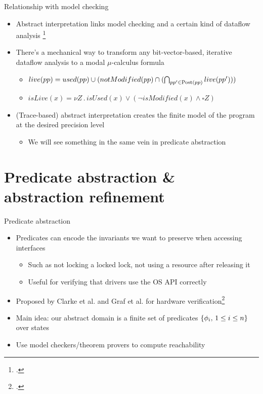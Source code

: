 \documentclass[aspectratio=169]{beamer}
\begin{document}
\begin{frame}{Relationship with model checking}
  \begin{itemize}[<+->]
  \item Abstract interpretation links model
    checking and a certain kind of dataflow analysis
    \footcite{schmidt1998program,schmidt1998data}
  \item There's a mechanical way to transform any bit-vector-based,
    iterative dataflow analysis to a modal $\mu$-calculus formula
    \begin{itemize}
    \item
      $live(pp) = used(pp) \cup (notModified(pp) \cap (\bigcap_{pp' \in
        \mathrm{Post}(pp)} live(pp')))$
      \vspace{.5em}
    \item
      $isLive(x) = \nu Z \,.\, isUsed(x) \vee (\neg isModified(x)
      \wedge \square Z)$
    \end{itemize}
  \item (Trace-based) abstract interpretation creates the finite model of the
    program at the desired precision level
    \begin{itemize}
    \item We will see something in the same vein in predicate abstraction
    \end{itemize}
  \end{itemize}
\end{frame}

\section{Predicate abstraction \& abstraction refinement}

\begin{frame}{Predicate abstraction}
  \begin{itemize}[<+->]
  \item Predicates can encode the invariants we want to preserve when accessing interfaces
    \begin{itemize}
    \item Such as not locking a locked lock, not using a resource after releasing it
    \item Useful for verifying that drivers use the OS API correctly
    \end{itemize}
  \item Proposed by Clarke et al. and Graf et al. for hardware verification\footcite{clarke1994model,graf1997construction}
  \item Main idea: our abstract domain is a finite set of predicates $\left\{\phi_i,\, 1 \le i\le n\right\}$ over states
  \item Use model checkers/theorem provers to compute reachability
  \end{itemize}
\end{frame}
\end{document}
